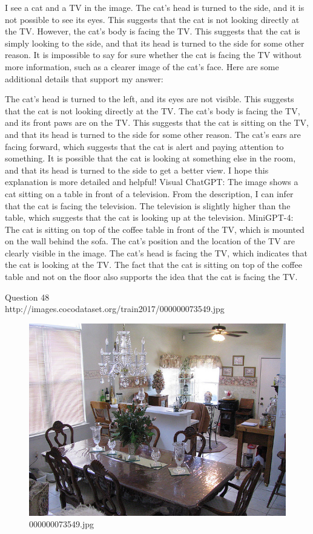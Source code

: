 \begin{enumerate}
    I see a cat and a TV in the image.
    The cat's head is turned to the side, and it is not possible to see its eyes. This suggests that the cat is not looking directly at the TV.
    However, the cat's body is facing the TV. This suggests that the cat is simply looking to the side, and that its head is turned to the side for some other reason.
    It is impossible to say for sure whether the cat is facing the TV without more information, such as a clearer image of the cat's face.
    Here are some additional details that support my answer:
    
    The cat's head is turned to the left, and its eyes are not visible. This suggests that the cat is not looking directly at the TV.
    The cat's body is facing the TV, and its front paws are on the TV. This suggests that the cat is sitting on the TV, and that its head is turned to the side for some other reason.
    The cat's ears are facing forward, which suggests that the cat is alert and paying attention to something. It is possible that the cat is looking at something else in the room, and that its head is turned to the side to get a better view.
    I hope this explanation is more detailed and helpful!
    \subitem Visual ChatGPT: The image shows a cat sitting on a table in front of a television. From the description, I can infer that the cat is facing the television. The television is slightly higher than the table, which suggests that the cat is looking up at the television.
    \subitem MiniGPT-4: The cat is sitting on top of the coffee table in front of the TV, which is mounted on the wall behind the sofa. The cat’s position and the location of the TV are clearly visible in the image. The cat’s head is facing the TV, which indicates that the cat is looking at the TV. The fact that the cat is sitting on top of the coffee table and not on the floor also supports the idea that the cat is facing the TV.
\end{enumerate}
Question 48\\
http://images.cocodataset.org/train2017/000000073549.jpg
\begin{figure}[h]
    \centering
    \includegraphics[width=0.8\linewidth]{../image set/hard/000000073549.jpg}
    \caption{000000073549.jpg}
\end{figure}
